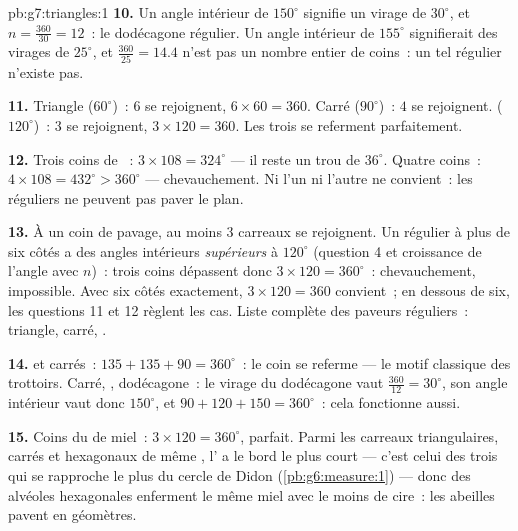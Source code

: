 \begin{solution}{pb:g7:triangles:1}
\textbf{10.} Un angle intérieur de $150^\circ$ signifie un virage de
$30^\circ$, et $n = \frac{360}{30} = 12$~: le dodécagone régulier.
Un angle intérieur de $155^\circ$ signifierait des virages de
$25^\circ$, et $\frac{360}{25} = 14.4$ n'est pas un nombre entier de
coins~: un tel  régulier n'existe pas.

\textbf{11.} Triangle ($60^\circ$)~: $6$ se rejoignent,
$6 \times 60 = 360$. Carré ($90^\circ$)~: $4$ se rejoignent.
 ($120^\circ$)~: $3$ se rejoignent,
$3 \times 120 = 360$. Les trois se referment parfaitement.

\textbf{12.} Trois coins de ~: $3 \times 108 = 324^\circ$
--- il reste un trou de $36^\circ$. Quatre coins~:
$4 \times 108 = 432^\circ > 360^\circ$ --- chevauchement. Ni l'un ni
l'autre ne convient~: les  réguliers ne peuvent pas paver
le plan.

\textbf{13.} À un coin de pavage, au moins $3$ carreaux se
rejoignent. Un  régulier à plus de six côtés a des angles
intérieurs \emph{supérieurs} à $120^\circ$ (question 4 et croissance
de l'angle avec $n$)~: trois coins dépassent donc
$3 \times 120 = 360^\circ$~: chevauchement, impossible. Avec six
côtés exactement, $3 \times 120 = 360$ convient~; en dessous de six,
les questions 11 et 12 règlent les cas. Liste complète des paveurs
réguliers~: triangle, carré, .

\textbf{14.}  et carrés~: $135 + 135 + 90 = 360^\circ$~: le
coin se referme --- le motif classique des trottoirs. Carré,
, dodécagone~: le virage du dodécagone vaut
$\frac{360}{12} = 30^\circ$, son angle intérieur vaut donc
$150^\circ$, et $90 + 120 + 150 = 360^\circ$~: cela fonctionne
aussi.

\textbf{15.} Coins du  de miel~: $3 \times 120 = 360^\circ$,
parfait. Parmi les carreaux triangulaires, carrés et hexagonaux de
même , l' a le bord le plus court --- c'est celui des
trois qui se rapproche le plus du cercle de Didon
(\cref{pb:g6:measure:1}) --- donc des alvéoles hexagonales
enferment le même miel avec le moins de cire~: les abeilles pavent
en géomètres.
\end{solution}
